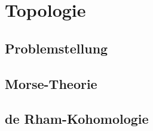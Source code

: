 %
%
%
\chapter{Topologie
\label{chapter:topologie}}

\section{Problemstellung}

\section{Morse-Theorie}

\section{de Rham-Kohomologie}

